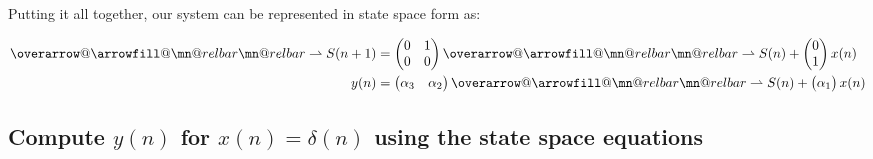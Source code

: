 \documentclass{article}
\makeatletter
\renewcommand{\thesubsection}{\thesection.\alph{subsection}}
\DeclareRobustCommand{\overrightharpoon}{\mathpalette{\overarrow@\rightharpoonfill@}}
\def\rightharpoonfill@{\arrowfill@\mn@relbar\mn@relbar\rightharpoonup}
\makeatother
\begin{document}
Putting it all together, our system can be represented in state space form as:

\begin{align*}
	\overrightharpoon{S(n + 1)} &= \begin{pmatrix} 0 & 1 \\ 0 & 0 \end{pmatrix}\overrightharpoon{S(n)} + \begin{pmatrix} 0 \\ 1 \end{pmatrix}x(n) \\
	y(n) &= \begin{pmatrix} \alpha_3 & \alpha_2 \end{pmatrix}\overrightharpoon{S(n)} + \begin{pmatrix} \alpha_1 \end{pmatrix}x(n)
\end{align*}

\subsection[~\thesubsection]{Compute $y(n)$ for $x(n) = \delta(n)$ using the state space equations}
\end{document}
